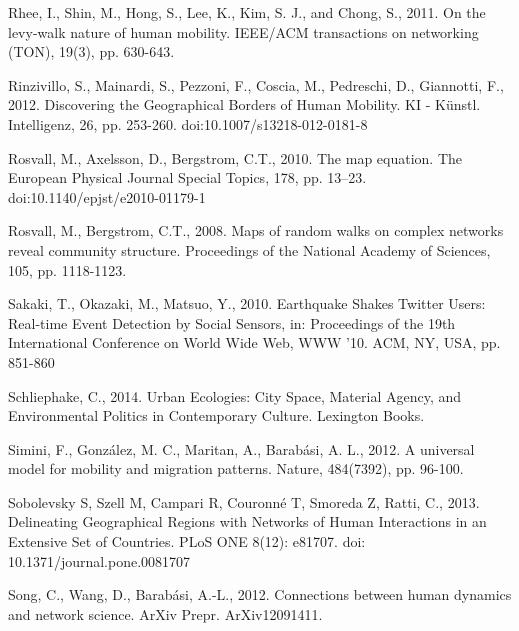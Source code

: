 \documentclass[]{tGIS2e}
\begin{document}
{\begin{thebibliography}{9}
Rhee, I., Shin, M., Hong, S., Lee, K., Kim, S. J., and Chong, S., 2011. On the levy-walk nature of human mobility. IEEE/ACM transactions on networking (TON), 19(3), pp. 630-643.

Rinzivillo, S., Mainardi, S., Pezzoni, F., Coscia, M., Pedreschi, D., Giannotti, F., 2012. Discovering the Geographical Borders of Human Mobility. KI - Künstl. Intelligenz, 26, pp. 253-260. doi:10.1007/s13218-012-0181-8

Rosvall, M., Axelsson, D., Bergstrom, C.T., 2010. The map equation. The European Physical Journal Special Topics, 178, pp. 13–23. doi:10.1140/epjst/e2010-01179-1

Rosvall, M., Bergstrom, C.T., 2008. Maps of random walks on complex networks reveal community structure. Proceedings of the National Academy of Sciences, 105, pp. 1118-1123.

Sakaki, T., Okazaki, M., Matsuo, Y., 2010. Earthquake Shakes Twitter Users: Real-time Event Detection by Social Sensors, in: Proceedings of the 19th International Conference on World Wide Web, WWW ’10. ACM, NY, USA, pp. 851-860

Schliephake, C., 2014. Urban Ecologies: City Space, Material Agency, and Environmental Politics in Contemporary Culture. Lexington Books.

Simini, F., González, M. C., Maritan, A., Barabási, A. L., 2012. A universal model for mobility and migration patterns. Nature, 484(7392), pp. 96-100.

Sobolevsky S, Szell M, Campari R, Couronné T, Smoreda Z, Ratti, C., 2013. Delineating Geographical Regions with Networks of Human Interactions in an Extensive Set of Countries. PLoS ONE 8(12): e81707. doi: 10.1371/journal.pone.0081707

Song, C., Wang, D., Barabási, A.-L., 2012. Connections between human dynamics and network science. ArXiv Prepr. ArXiv12091411.


\end{thebibliography}}
\end{document}
